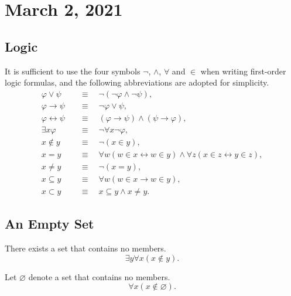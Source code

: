 \documentclass[11pt]{article}
\begin{document}
\section{March 2, 2021}
\subsection{Logic}
It is sufficient to use the four symbols $\neg$, $\wedge$, $\forall$ and $\in$ when writing first-order logic formulas, and the following abbreviations are adopted for simplicity.
\begin{align*}
  \varphi \vee \psi \quad &\equiv \quad \neg (\neg \varphi \wedge \neg \psi), \\
  \varphi \rightarrow \psi \quad &\equiv \quad \neg \varphi \vee \psi, \\
  \varphi \leftrightarrow \psi \quad &\equiv \quad (\varphi \rightarrow \psi) \wedge (\psi \rightarrow \varphi), \\
  \exists x \varphi \quad &\equiv \quad \neg \forall x \neg \varphi, \\
  x \notin y \quad &\equiv \quad \neg (x \in y), \\
  x = y \quad &\equiv \quad \forall w (w \in x \leftrightarrow w \in y) \wedge \forall z (x \in z \leftrightarrow y \in z), \\
  x \neq y \quad &\equiv \quad \neg (x = y), \\
  x \subseteq y \quad &\equiv \quad \forall w (w \in x \rightarrow w \in y), \\
  x \subset y \quad &\equiv \quad x \subseteq y \wedge x \neq y.
\end{align*}

\subsection{An Empty Set}
\begin{axiom}
  There exists a set that contains no members.
  \begin{equation*}
    \exists y \forall x (x \notin y).
  \end{equation*}
\end{axiom}

\begin{definition}
  Let $\varnothing$ denote a set that contains no members.
  \begin{equation*}
    \forall x (x \notin \varnothing).
  \end{equation*}
\end{definition}
\end{document}

